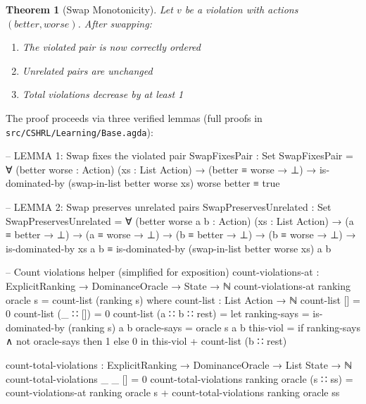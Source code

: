 \documentclass[9pt,a4paper]{article}
\newcommand{\fpath}[1]{\nolinkurl{#1}}
\theoremstyle{plain}
\newtheorem{theorem}{Theorem}
\theoremstyle{definition}
\theoremstyle{remark}
\begin{document}
\begin{theorem}[Swap Monotonicity]
Let $v$ be a violation with actions $(better, worse)$. After swapping:
\begin{enumerate}
\item The violated pair is now correctly ordered
\item Unrelated pairs are unchanged
\item Total violations decrease by at least 1
\end{enumerate}
\end{theorem}

The proof proceeds via three verified lemmas (full proofs in \fpath{src/CSHRL/Learning/Base.agda}):

\begin{code}
  -- LEMMA 1: Swap fixes the violated pair
  SwapFixesPair : Set
  SwapFixesPair = ∀ (better worse : Action) (xs : List Action) →
    (better ≡ worse → ⊥) →
    is-dominated-by (swap-in-list better worse xs) worse better ≡ true

  -- LEMMA 2: Swap preserves unrelated pairs
  SwapPreservesUnrelated : Set
  SwapPreservesUnrelated = ∀ (better worse a b : Action) (xs : List Action) →
    (a ≡ better → ⊥) → (a ≡ worse → ⊥) →
    (b ≡ better → ⊥) → (b ≡ worse → ⊥) →
    is-dominated-by xs a b ≡ is-dominated-by (swap-in-list better worse xs) a b
\end{code}

\begin{code}[hide]
  -- Count violations helper (simplified for exposition)
  count-violations-at : ExplicitRanking → DominanceOracle → State → ℕ
  count-violations-at ranking oracle s = count-list (ranking s)
    where
      count-list : List Action → ℕ
      count-list [] = 0
      count-list (_ ∷ []) = 0
      count-list (a ∷ b ∷ rest) = 
        let ranking-says = is-dominated-by (ranking s) a b
            oracle-says  = oracle s a b
            this-viol    = if ranking-says ∧ not oracle-says then 1 else 0
        in this-viol + count-list (b ∷ rest)

  count-total-violations : ExplicitRanking → DominanceOracle → List State → ℕ
  count-total-violations _ _ [] = 0
  count-total-violations ranking oracle (s ∷ ss) = 
    count-violations-at ranking oracle s + count-total-violations ranking oracle ss
\end{code}
\end{document}

